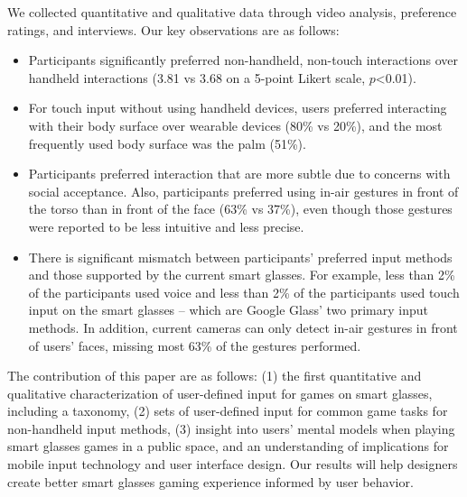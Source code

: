\documentclass{sigchi}
\begin{document}
We collected quantitative and qualitative data through video analysis, preference ratings, and interviews. 
Our key observations are as follows:
\begin{itemize}
  \item Participants significantly preferred non-handheld, non-touch interactions over handheld interactions (3.81  vs 3.68 on a 5-point Likert scale, $p$\textless 0.01).
  \item For touch input without using handheld devices, users preferred interacting with their body surface over wearable devices (80\% vs 20\%), and the most frequently used body surface was the palm (51\%).
  \item Participants preferred interaction that are more subtle due to concerns with social acceptance. Also, participants preferred using in-air gestures in front of the torso than in front of the face (63\% vs 37\%), even though those gestures were reported to be less intuitive and less precise.
  \item There is significant mismatch between participants' preferred input methods and those supported by the current smart glasses. For example, less than 2\% of the participants used voice and less than 2\% of the participants used touch input on the smart glasses -- which are Google Glass' two primary input methods. In addition, current cameras can only detect in-air gestures in front of users' faces, missing most 63\% of the gestures performed.
\end{itemize}


 
The contribution of this paper are as follows:
(1) the first quantitative and qualitative characterization of user-defined input for games on smart glasses, including a taxonomy, 
(2) sets of user-defined input for common game tasks for non-handheld input methods, 
(3) insight into users' mental models when playing smart glasses games in a public space, and an understanding of implications for mobile input technology and user interface design.
Our results will help designers create better smart glasses gaming experience informed by user behavior.

\end{document}
